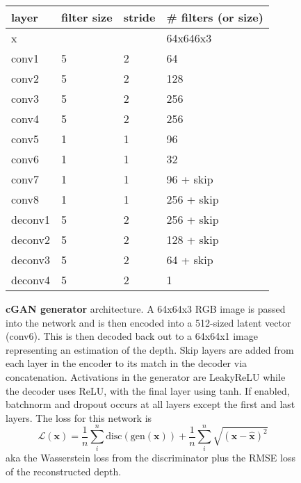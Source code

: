 \documentclass[twoside,11pt,a4paper]{article}
\newcommand{\drawcnnlayer}[7]{
  \path (0,0);
  \begin{scope}[shift={#1}]
  \draw[black,fill=#5] (0,0,0) -- ++(-#2,0,0) -- ++(0,-#3,0) -- ++(#2,0,0) -- cycle;
  \draw[black,fill=#5] (0,0,0) -- ++(0,0,-#4) -- ++(0,-#3,0) -- ++(0,0,#4) -- cycle;
  \draw[black,fill=#5] (0,0,0) -- ++(-#2,0,0) -- ++(0,0,-#4) -- ++(#2,0,0) -- cycle;
  \end{scope}
}
\begin{document}
\begin{figure}
\begin{center}

    \vspace{1em}

    \begin{tabular}{l||l|l|l}
      layer & filter size & stride & \# filters (or size) \\
      \hline
      x & & & 64x646x3 \\
      conv1 & 5 & 2 & 64 \\
      conv2 & 5 & 2 & 128 \\
      conv3 & 5 & 2 & 256 \\
      conv4 & 5 & 2 & 256 \\
      conv5 & 1 & 1 & 96 \\
      \hline
      conv6 & 1 & 1 & 32 \\
      \hline
      conv7 & 1 & 1 & 96 + skip\\
      conv8 & 1 & 1 & 256 + skip\\
      deconv1 & 5 & 2 & 256 + skip\\
      deconv2 & 5 & 2 & 128 + skip\\
      deconv3 & 5 & 2 & 64 + skip\\
      deconv4 & 5 & 2 & 1 \\
    \end{tabular}


  \end{center}
  \caption{
    \textbf{cGAN generator} architecture.
    A 64x64x3 RGB image is passed into the network and is then encoded into a 512-sized latent vector (conv6).
    This is then decoded back out to a 64x64x1 image representing an estimation of the depth.
    Skip layers are added from each layer in the encoder to its match in the decoder via concatenation.
    Activations in the generator are LeakyReLU while the decoder uses ReLU, with the final layer using tanh.
    If enabled, batchnorm and dropout occurs at all layers except the first and last layers.
    The loss for this network is
    \begin{equation}
      \mathcal{L(\textbf{x})} = \frac{1}{n}\sum_i^n \text{disc}(\text{gen}(\textbf{x})) + \frac{1}{n}\sum_i^n \sqrt{(\textbf{x}-\hat{\textbf{x}})^2}
    \end{equation}
    aka the Wasserstein loss from the discriminator plus the RMSE loss of the reconstructed depth.}
  
  \label{fig:cgan-generator}
\end{figure}
\end{document}
